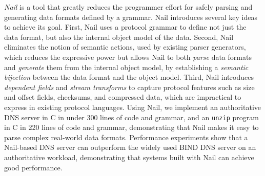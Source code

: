 % 
% 
%


\textit{Nail} is a tool that greatly reduces the
programmer effort for safely parsing and generating data formats defined
by a grammar.
Nail introduces several key
ideas to achieve its goal.  First, Nail uses a protocol grammar to
define not just the data format, but also the internal object model
of the data.  Second, Nail eliminates the notion of semantic actions,
used by existing parser generators, which reduces the expressive power
but allows Nail to both {\em parse} data formats and {\em generate}
them from the internal object model, by establishing a {\em semantic
bijection} between the data format and the object model.  Third,
Nail introduces {\em dependent fields} and {\em stream transforms} to
capture protocol features such as size and offset fields, checksums,
and compressed data, which are impractical to express in existing
protocol languages.  Using Nail, we implement an authoritative  DNS server in
C in under 300 lines of code and grammar, and an {\tt unzip}
program in C in 220 lines of code and grammar, demonstrating that Nail
makes it easy to parse complex real-world data formats.  Performance
experiments show that a Nail-based DNS server can outperform the widely
used BIND DNS server on an authoritative workload,
 demonstrating that systems built with Nail can achieve good
performance.

